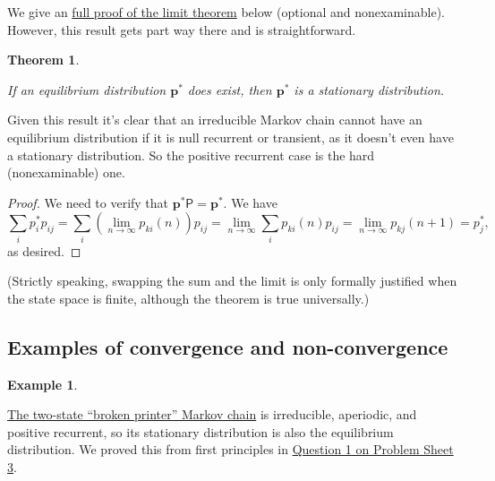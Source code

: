 \documentclass[
  a4paper,
]{article}
\newtheorem{theorem}{Theorem}[section]
\theoremstyle{definition}
\theoremstyle{definition}
\newtheorem{example}{Example}[section]
\theoremstyle{definition}
\theoremstyle{remark}
\begin{document}
We give an \protect\hyperlink{S11-proofs}{full proof of the limit theorem} below (optional and nonexaminable). However, this result gets part way there and is straightforward.

\begin{theorem}
\protect\hypertarget{thm:unlabeled-div-15}{}\label{thm:unlabeled-div-15}

If an equilibrium distribution \(\mathbf p^*\) does exist, then \(\mathbf p^*\) is a stationary distribution.

\end{theorem}

Given this result it's clear that an irreducible Markov chain cannot have an equilibrium distribution if it is null recurrent or transient, as it doesn't even have a stationary distribution. So the positive recurrent case is the hard (nonexaminable) one.

\begin{proof}

We need to verify that \(\mathbf p^* \mathsf P = \mathbf p^*\). We have
\[ \sum_i p_i^* p_{ij} = \sum_i \left(\lim_{n\to\infty} p_{ki}(n) \right) p_{ij} = \lim_{n\to\infty} \sum_i p_{ki}(n) p_{ij} = \lim_{n\to\infty} p_{kj}(n+1) = p^*_j , \]
as desired.

\end{proof}

(Strictly speaking, swapping the sum and the limit is only formally justified when the state space is finite, although the theorem is true universally.)

\hypertarget{convergence-examples}{%
\subsection{Examples of convergence and non-convergence}\label{convergence-examples}}

\begin{example}
\protect\hypertarget{exm:conv1}{}\label{exm:conv1}

\protect\hyperlink{S05-example}{The two-state ``broken printer'' Markov chain} is irreducible, aperiodic, and positive recurrent, so its stationary distribution is also the equilibrium distribution. We proved this from first principles in \protect\hyperlink{P03}{Question 1 on Problem Sheet 3}.

\end{example}
\end{document}
